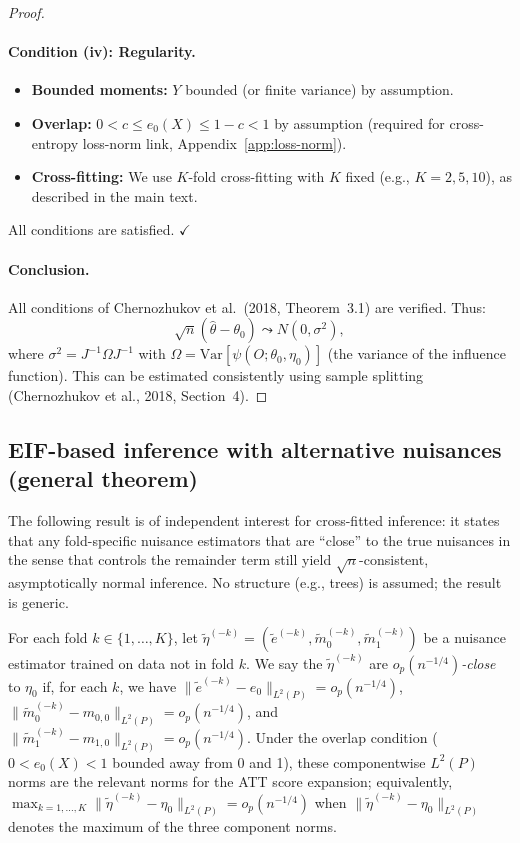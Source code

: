 \documentclass[12pt]{article}
\begin{document}
\begin{proof}
\paragraph{Condition (iv): Regularity.}
\begin{itemize}
\item \textbf{Bounded moments:} $Y$ bounded (or finite variance) by assumption.
\item \textbf{Overlap:} $0 < c \le e_0(X) \le 1-c < 1$ by assumption (required for cross-entropy loss-norm link, Appendix~\ref{app:loss-norm}).
\item \textbf{Cross-fitting:} We use $K$-fold cross-fitting with $K$ fixed (e.g., $K = 2, 5, 10$), as described in the main text.
\end{itemize}
All conditions are satisfied. $\checkmark$

\paragraph{Conclusion.}
All conditions of Chernozhukov et al.\ (2018, Theorem~3.1) are verified. Thus:
\[
\sqrt{n}(\hat\theta - \theta_0) \leadsto N(0, \sigma^2),
\]
where $\sigma^2 = J^{-1} \Omega J^{-1}$ with $\Omega = \text{Var}[\psi(O; \theta_0, \eta_0)]$ (the variance of the influence function). This can be estimated consistently using sample splitting (Chernozhukov et al., 2018, Section~4).
\end{proof}

\subsection{EIF-based inference with alternative nuisances (general theorem)}
\label{app:alt-nuisances}

The following result is of independent interest for cross-fitted inference: it states that any fold-specific nuisance estimators that are ``close'' to the true nuisances in the sense that controls the remainder term still yield $\sqrt{n}$-consistent, asymptotically normal inference. No structure (e.g., trees) is assumed; the result is generic.

\begin{definition}
\label{def:close}
For each fold $k \in \{1,\ldots,K\}$, let $\tilde{\eta}^{(-k)} = (\tilde{e}^{(-k)}, \tilde{m}_0^{(-k)}, \tilde{m}_1^{(-k)})$ be a nuisance estimator trained on data not in fold $k$. We say the $\tilde{\eta}^{(-k)}$ are \emph{$o_p(n^{-1/4})$-close} to $\eta_0$ if, for each $k$, we have $\|\tilde{e}^{(-k)} - e_0\|_{L^2(P)} = o_p(n^{-1/4})$, $\|\tilde{m}_0^{(-k)} - m_{0,0}\|_{L^2(P)} = o_p(n^{-1/4})$, and $\|\tilde{m}_1^{(-k)} - m_{1,0}\|_{L^2(P)} = o_p(n^{-1/4})$. Under the overlap condition ($0 < e_0(X) < 1$ bounded away from 0 and 1), these componentwise $L^2(P)$ norms are the relevant norms for the ATT score expansion; equivalently, $\max_{k=1,\ldots,K} \|\tilde{\eta}^{(-k)} - \eta_0\|_{L^2(P)} = o_p(n^{-1/4})$ when $\|\tilde{\eta}^{(-k)} - \eta_0\|_{L^2(P)}$ denotes the maximum of the three component norms.
\end{definition}
\end{document}
